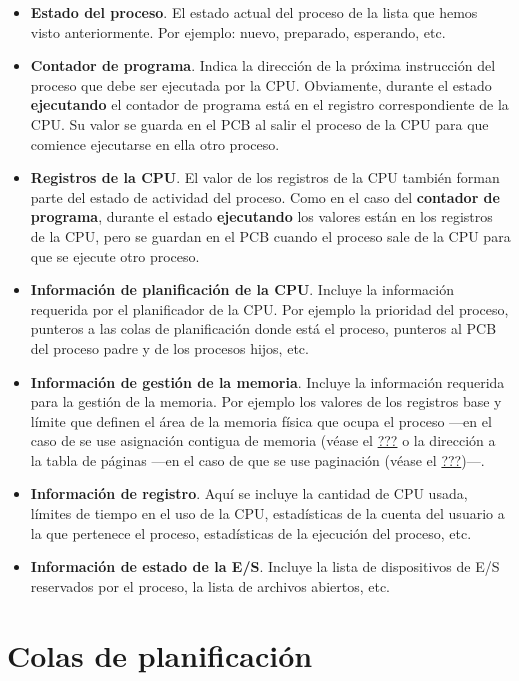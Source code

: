 \begin{itemize}
\item
  \textbf{Estado del proceso}. El estado actual del proceso de la lista
  que hemos visto anteriormente. Por ejemplo: nuevo, preparado,
  esperando, etc.
\item
  \textbf{Contador de programa}. Indica la dirección de la próxima
  instrucción del proceso que debe ser ejecutada por la CPU. Obviamente,
  durante el estado \textbf{ejecutando} el contador de programa está en
  el registro correspondiente de la CPU. Su valor se guarda en el PCB al
  salir el proceso de la CPU para que comience ejecutarse en ella otro
  proceso.
\item
  \textbf{Registros de la CPU}. El valor de los registros de la CPU
  también forman parte del estado de actividad del proceso. Como en el
  caso del \textbf{contador de programa}, durante el estado
  \textbf{ejecutando} los valores están en los registros de la CPU, pero
  se guardan en el PCB cuando el proceso sale de la CPU para que se
  ejecute otro proceso.
\item
  \textbf{Información de planificación de la CPU}. Incluye la
  información requerida por el planificador de la CPU. Por ejemplo la
  prioridad del proceso, punteros a las colas de planificación donde
  está el proceso, punteros al PCB del proceso padre y de los procesos
  hijos, etc.
\item
  \textbf{Información de gestión de la memoria}. Incluye la información
  requerida para la gestión de la memoria. Por ejemplo los valores de
  los registros base y límite que definen el área de la memoria física
  que ocupa el proceso ---en el caso de se use asignación contigua de
  memoria (véase el \hyperref[_asignacion_contigua_de_memoria]{???} o
  la dirección a la tabla de páginas ---en el caso de que se use
  paginación (véase el \hyperref[paginacion]{???})---.
\item
  \textbf{Información de registro}. Aquí se incluye la cantidad de CPU
  usada, límites de tiempo en el uso de la CPU, estadísticas de la
  cuenta del usuario a la que pertenece el proceso, estadísticas de la
  ejecución del proceso, etc.
\item
  \textbf{Información de estado de la E/S}. Incluye la lista de
  dispositivos de E/S reservados por el proceso, la lista de archivos
  abiertos, etc.
\end{itemize}

\section{Colas de planificación}\label{_colas_de_planificacion}

